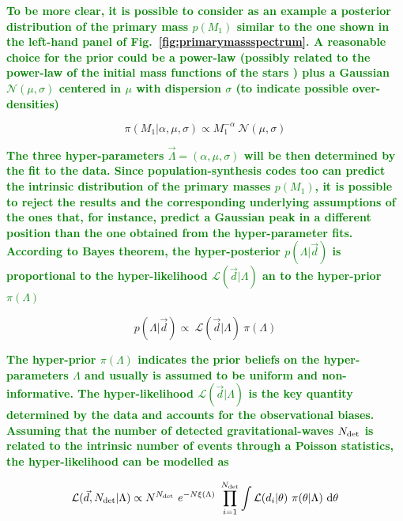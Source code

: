 \documentclass[a4paper,titlepage]{book}     	%
\newcommand{\erika}[1]{\textcolor{green}{\bf#1}}
\begin{document}
\erika{To be more clear, it is possible to consider as an example a posterior distribution of the primary mass $p(M_1)$ similar to the one shown in the left-hand panel of Fig.\ \ref{fig:primarymassspectrum}. A reasonable choice for the prior could be a power-law (possibly related to the power-law of the initial mass functions of the stars \cite{Kroupa2001}) plus a Gaussian $\mathcal{N} (\mu,\sigma)$ centered in $\mu$ with dispersion $\sigma$ (to indicate possible over-densities)} %

\begin{equation}\label{eq:priormassprimary}
    \pi(M_1|\alpha,\mu,\sigma) \propto M_1^{-\alpha}~\mathcal{N} (\mu,\sigma)
\end{equation}

\erika{The three hyper-parameters $\vec{\Lambda} = (\alpha,\mu,\sigma)$ will be then determined by the fit to the data. Since population-synthesis codes too can predict the intrinsic distribution of the primary masses $p(M_1)$, it is possible to reject the results and the corresponding underlying assumptions of the ones that, for instance, predict a Gaussian peak in a different position than the one obtained from the hyper-parameter fits.}\\


\erika{According to Bayes theorem, the hyper-posterior $p(\Lambda|\vec{d})$ is proportional to the hyper-likelihood $\mathcal{L}(\vec{d}|\Lambda)$ an to the hyper-prior $\pi(\Lambda)$}

\begin{equation}\label{eq:hyperposterior}
     p(\Lambda|\vec{d}) \propto~\mathcal{L}(\vec{d}|\Lambda)~\pi(\Lambda)
\end{equation}

\erika{The hyper-prior $\pi(\Lambda)$ indicates the prior beliefs on the hyper-parameters $\Lambda$ and usually is assumed to be uniform and non-informative. The hyper-likelihood $\mathcal{L}(\vec{d}|\Lambda)$ is the key quantity determined by the data and accounts for the observational biases. Assuming that the number of detected gravitational-waves $N_{\rm det}$ is related to the intrinsic number of events through a Poisson statistics, the hyper-likelihood can be modelled as}

\begin{equation}\label{eq:hyperlikelihood}
    \mathcal{L}(\vec{d}, N_{\rm det}| \Lambda) \propto N^{N_{\rm det}}~e^{-N\xi(\Lambda)} ~\prod_{i=1}^{N_{\rm det}} \int \mathcal{L}(d_i|\theta)~\pi(\theta|\Lambda)~\rm d\theta
\end{equation}
\end{document}
